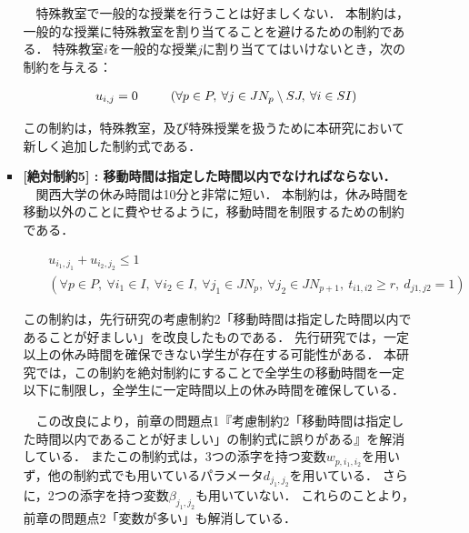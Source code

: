 \documentclass[12pt, a4paper, fleqn]{jreport}
\begin{document}
\begin{itemize}
\begin{itemize}
\begin{itemize}
\vspace{-5.0mm}
　特殊教室で一般的な授業を行うことは好ましくない．
本制約は，一般的な授業に特殊教室を割り当てることを避けるための制約である．
特殊教室$i$を一般的な授業$j$に割り当ててはいけないとき，次の制約を与える：

\vspace{-3.0mm}
\begin{eqnarray}
\label{hzettai42} 
&&u_{i,j} = 0 \hspace{5.0mm}
\quad \left(\forall p \in P, \: \forall j \in JN_{p}\setminus SJ, \: \forall i \in SI\right )
\end{eqnarray}

\vspace{3.0mm}
この制約は，特殊教室，及び特殊授業を扱うために本研究において新しく追加した制約式である．

\vspace{3.0mm}
\item {\bf  [絶対制約5] : 移動時間は指定した時間以内でなければならない．}\\

\vspace{-5.0mm}
　関西大学の休み時間は10分と非常に短い．
本制約は，休み時間を移動以外のことに費やせるように，移動時間を制限するための制約である．

\vspace{-3.0mm}
\begin{eqnarray}
\label{hzettai5} 
&&u_{i_1,j_1} + u_{i_2,j_2} \leq 1\\
&&\left(\forall p \in P, \: \forall i_1 \in I,\: \forall i_2 \in I,\: \forall j_1 \in JN_{p},\: \forall j_2 \in JN_{p+1},\:t_{i1, i2} \ge r, \: d_{j1, j2} = 1\right)\nonumber
\end{eqnarray}

\vspace{3.0mm}
この制約は，先行研究の考慮制約2「移動時間は指定した時間以内であることが好ましい」を改良したものである．
先行研究では，一定以上の休み時間を確保できない学生が存在する可能性がある．
本研究では，この制約を絶対制約にすることで全学生の移動時間を一定以下に制限し，全学生に一定時間以上の休み時間を確保している．

　この改良により，前章の問題点1『考慮制約2「移動時間は指定した時間以内であることが好ましい」の制約式に誤りがある』を解消している．
またこの制約式は，3つの添字を持つ変数$w_{p,i_1,i_2}$を用いず，他の制約式でも用いているパラメータ$d_{j_1,j_2}$を用いている．
さらに，2つの添字を持つ変数$\beta_{j_1,j_2}$も用いていない．
これらのことより，前章の問題点2「変数が多い」も解消している．


\end{itemize}
\end{itemize}
\end{itemize}
\end{document}
